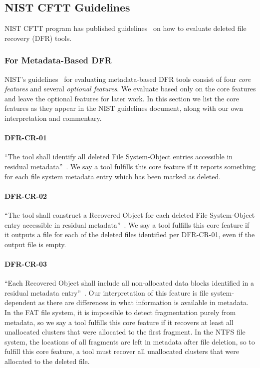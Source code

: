 \subsection{NIST CFTT Guidelines}
NIST CFTT program has published guidelines~\cite{meta:dfr:standards,carving_standards} on how to evaluate deleted file recovery (DFR) tools.

\subsubsection{For Metadata-Based DFR}
NIST's guidelines~\cite{meta:dfr:standards} for evaluating metadata-based DFR tools consist of four \emph{core features} and several \emph{optional features}. We evaluate based only on the core features and leave the optional features for later work.
In this section we list the core features as they appear in the NIST guidelines document, along with our own interpretation and commentary.

 \paragraph{DFR-CR-01} ``The tool shall identify all deleted File System-Object entries accessible in residual metadata''~\cite{meta:dfr:standards}.
 We say a tool fulfills this core feature if it reports something for each file system metadata entry which has been marked as deleted.
 
 \paragraph{DFR-CR-02} ``The tool shall construct a Recovered Object for each deleted File System-Object entry accessible in residual metadata''~\cite{meta:dfr:standards}.
 We say a tool fulfills this core feature if it outputs a file for each of the deleted files identified per DFR-CR-01, even if the output file is empty.

 \paragraph{DFR-CR-03} ``Each Recovered Object shall include all non-allocated data blocks identified in a residual metadata entry''~\cite{meta:dfr:standards}.
 Our interpretation of this feature is file system-dependent as there are differences in what information is available in metadata.
 In the FAT file system, it is impossible to detect fragmentation purely from metadata, so we say a tool fulfills this core feature if it recovers at least all unallocated clusters that were allocated to the first fragment.
 In the NTFS file system, the locations of all fragments are left in metadata after file deletion, so to fulfill this core feature, a tool must recover all unallocated clusters that were allocated to the deleted file.


